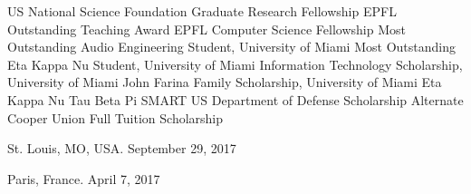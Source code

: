 \documentclass[9pt]{article}
\begin{document}
\noindent US National Science Foundation Graduate Research Fellowship 
\newline\noindent EPFL Outstanding Teaching Award 
\newline\noindent EPFL Computer Science Fellowship 
\newline\noindent Most Outstanding Audio Engineering Student, University of Miami 
\newline\noindent Most Outstanding Eta Kappa Nu Student, University of Miami 
\newline\noindent Information Technology Scholarship, University of Miami 
\newline\noindent John Farina Family Scholarship, University of Miami 
\newline\noindent Eta Kappa Nu 
\newline\noindent Tau Beta Pi 
\newline\noindent SMART US Department of Defense Scholarship Alternate 
\newline\noindent Cooper Union Full Tuition Scholarship 

\bigskip

\pagebreak

\medskip
{}

\vspace{-0.02in}
 \vspace{-0.03in}
\newline{}
\linebreak\noindent St. Louis, MO, USA. September 29, 2017
\bigskip

\vspace{-0.03in}
\newline{}\vspace{-0.03in}
\newline{}\dates{}
\linebreak\noindent Paris, France. April 7, 2017
\bigskip
\end{document}

